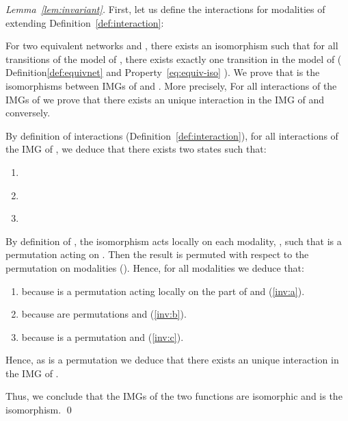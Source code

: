 \documentclass[12pt]{elsarticle}
\begin{document}
\begin{proof}[Lemma~\ref{lem:invariant}]
First, let us  define the interactions for modalities of   extending Definition~\ref{def:interaction}:


For two equivalent networks  and ,  there exists an isomorphism  such that for all transitions of the model of ,  there exists exactly one transition  in the model of  ( Definition\ref{def:equivnet} and Property~\ref{eq:equiv-iso} ). We prove that  is the isomorphisms between IMGs of  and . More precisely,  For all interactions  of the IMGs of  we prove that there exists an unique interaction  in the IMG of  and conversely.  

\medskip 
By definition of interactions (Definition~\ref{def:interaction}), for all interactions  of the IMG of , we deduce that there exists two states  such that:
\begin{enumerate}
\item  \label{inv:a}
\item  \label{inv:b}
\item  \label{inv:c}
\end{enumerate}

By definition of , the isomorphism acts locally on each modality, , such that  is a permutation acting on . Then the result is permuted with respect to the permutation on modalities (). Hence, for all modalities  
we deduce that: 
 \begin{enumerate}
\item  because  is a permutation  acting locally on  the part of  and (\ref{inv:a}).
\item  because  are permutations and (\ref{inv:b}). 
 \item  because  is a permutation and (\ref{inv:c}).
\end{enumerate}
Hence, as  is a permutation  we deduce that there exists an unique interaction  in the IMG of . 

\medskip
\noindent
 Thus, we conclude that the IMGs of the two functions are isomorphic and  is the isomorphism.
\qed \end{proof}
\end{document}
